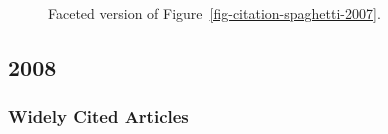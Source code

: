 \documentclass[
  10pt,
  letterpaper,
  DIV=11,
  numbers=noendperiod,
  twoside]{scrartcl}
\begin{document}
\begin{figure}


\caption{\label{fig-citation-facet-2007}Faceted version of
Figure~\ref{fig-citation-spaghetti-2007}.}

\end{figure}%

\newpage

\subsection{2008}\label{sec-s2008}

\subsubsection*{Widely Cited Articles}\label{widely-cited-articles-52}
\end{document}
